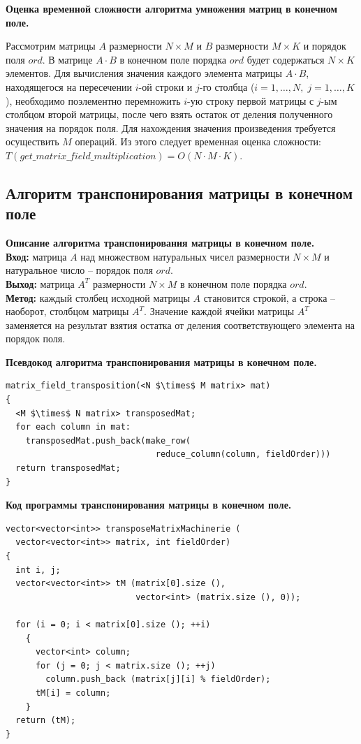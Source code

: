 \documentclass[spec, och, otchet, hidelinks]{SCWorks}
\newcommand{\tbf}[1]{\textbf{#1}}
\begin{document}
\newpage

\par \tbf{Оценка временной сложности алгоритма умножения матриц в конечном
  поле.}
\par Рассмотрим матрицы $A$ размерности $N \times M$ и $B$ размерности $M \times
K$ и порядок поля $ord$. В матрице $A \cdot B$ в конечном поле порядка $ord$
будет содержаться $N \times K$ элементов. Для вычисления
значения каждого элемента матрицы $A \cdot B$, находящегося на пересечении
$i$-ой строки и $j$-го столбца ($i = 1,\dots,N, \; j = 1,\dots,K$), необходимо
поэлементно перемножить $i$-ую строку первой матрицы с $j$-ым столбцом второй
матрицы, после чего взять остаток от деления полученного значения на порядок
поля. Для нахождения значения произведения требуется осуществить $M$
операций. Из этого следует временная оценка сложности:
$T(get\_matrix\_field\_multiplication) = O(N \cdot M \cdot K)$.

\newpage

\subsection{Алгоритм транспонирования матрицы в конечном поле}
\par \tbf{Описание алгоритма транспонирования матрицы в конечном поле.} \\
\tbf{Вход:} матрица $A$ над множеством натуральных чисел размерности $N \times M$ и
натуральное число -- порядок поля $ord$. \\
\tbf{Выход:} матрица $A^{T}$ размерности $N \times M$ в конечном поле порядка
$ord$. \\
\tbf{Метод:} каждый столбец исходной матрицы $A$ становится строкой, а строка --
наоборот, столбцом матрицы $A^{T}$. Значение каждой ячейки матрицы $A^{T}$
заменяется на результат взятия остатка от деления соответствующего элемента на
порядок поля.

\par \tbf{Псевдокод алгоритма транспонирования матрицы в конечном поле.}
\begin{lstlisting}[caption=Псевдокод алгоритма., mathescape]
matrix_field_transposition(<N $\times$ M matrix> mat)
{
  <M $\times$ N matrix> transposedMat;
  for each column in mat:
    transposedMat.push_back(make_row(
                              reduce_column(column, fieldOrder)))
  return transposedMat;
}
\end{lstlisting}

\par \tbf{Код программы транспонирования матрицы в конечном поле.}
\begin{lstlisting}[caption=Код программы., mathescape]
vector<vector<int>> transposeMatrixMachinerie (
  vector<vector<int>> matrix, int fieldOrder)
{
  int i, j;
  vector<vector<int>> tM (matrix[0].size (), 
                          vector<int> (matrix.size (), 0));

  for (i = 0; i < matrix[0].size (); ++i)
    {
      vector<int> column;
      for (j = 0; j < matrix.size (); ++j)
        column.push_back (matrix[j][i] % fieldOrder);
      tM[i] = column;
    }
  return (tM);
}
\end{lstlisting}
\end{document}
